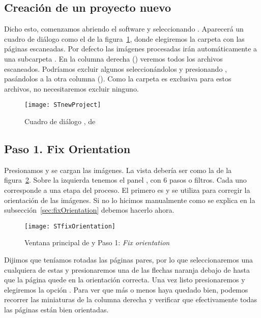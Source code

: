 \documentclass[%
	a5paper,
	10pt,
	twoside,
	openright,
	final,
]{memoir}
\begin{document}
	\subsection{Creación de un proyecto nuevo} Dicho esto, comenzamos abriendo el software y seleccionando . Aparecerá un cuadro de diálogo como el de la figura~\ref{fig:STnewProject}, donde elegiremos la carpeta con las páginas escaneadas. Por defecto las imágenes procesadas irán automáticamente a una subcarpeta . En la columna derecha () veremos todos los archivos escaneados. Podríamos excluir algunos seleccionándolos y presionando , pasándolos a la otra columna (). Como la carpeta  es exclusiva para estos archivos, no necesitaremos excluir ninguno.

	\begin{figure}
		\centering
		\texttt{[image: STnewProject]}
		\caption[Cuadro de diálogo New Project, de \scantailor]{Cuadro de diálogo , de \scantailor\label{fig:STnewProject}}
	\end{figure}

	\subsection{Paso 1. Fix Orientation} Presionamos  y se cargan las imágenes. La vista debería ser como la de la figura~\ref{fig:STfixOrientation}. Sobre la izquierda tenemos el panel , con 6 pasos o filtros. Cada uno corresponde a una etapa del proceso. El primero es  y se utiliza para corregir la orientación de las imágenes. Si no lo hicimos manualmente como se explica en la subsección~\ref{sec:fixOrientation} debemos hacerlo ahora.

	\begin{figure}
		\centering
		\texttt{[image: STfixOrientation]}
		\caption[Paso 1: \emph{Fix orientation}]{Ventana principal de \scantailor y Paso 1: \emph{Fix orientation}\label{fig:STfixOrientation}}
	\end{figure}

	Dijimos que teníamos rotadas las páginas pares, por lo que seleccionaremos una cualquiera de estas y presionaremos una de las flechas naranja debajo de  hasta que la página quede en la orientación correcta. Una vez listo presionaremos  y elegiremos la opción . Para ver que más o menos haya quedado bien, podemos recorrer las miniaturas de la columna derecha y verificar que efectivamente todas las páginas están bien orientadas.
\end{document}
